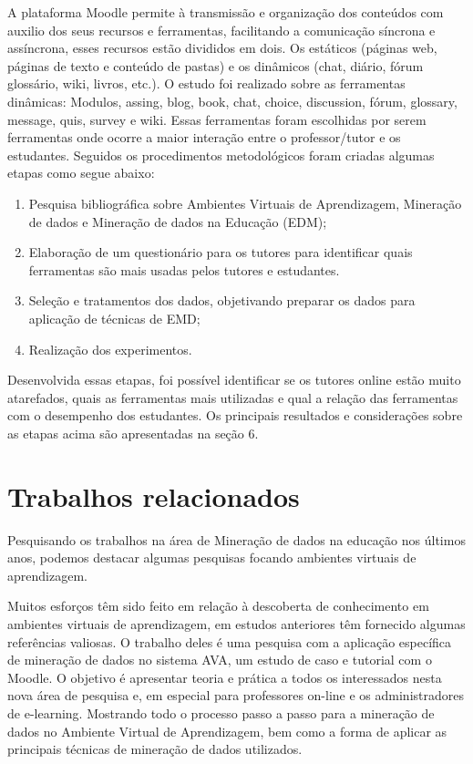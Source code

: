 \documentclass[12pt]{article}
\begin{document}
A plataforma Moodle permite à transmissão e organização dos conteúdos com auxilio dos seus recursos e ferramentas, facilitando a comunicação síncrona e assíncrona, esses recursos estão divididos em dois. Os estáticos (páginas web, páginas de texto e conteúdo de pastas) e os dinâmicos (chat, diário, fórum glossário, wiki, livros, etc.). O estudo foi realizado sobre as ferramentas dinâmicas: Modulos, assing, blog, book, chat, choice, discussion, fórum, glossary, message, quis, survey e wiki. Essas ferramentas foram escolhidas por serem ferramentas onde ocorre a maior interação entre o professor/tutor e os estudantes.
Seguidos os procedimentos metodológicos foram criadas algumas etapas como segue abaixo:
\begin{enumerate}
\item	Pesquisa bibliográfica sobre Ambientes Virtuais de Aprendizagem, Mineração de dados e Mineração de dados na Educação (EDM);
\item Elaboração de um questionário para os tutores para identificar quais ferramentas são mais usadas pelos tutores e estudantes. 
\item Seleção e tratamentos dos dados, objetivando preparar os dados para aplicação de técnicas de EMD;
\item Realização dos experimentos.
\end{enumerate} 
Desenvolvida essas etapas, foi possível identificar se os tutores online estão muito atarefados, quais as ferramentas mais utilizadas e qual a relação das ferramentas com o desempenho dos estudantes. Os principais resultados e considerações sobre as etapas acima são apresentadas na seção 6.

\section{Trabalhos relacionados}
Pesquisando os trabalhos na área de Mineração de dados na educação nos últimos anos, podemos destacar algumas pesquisas focando ambientes virtuais de aprendizagem. 

Muitos esforços têm sido feito em relação à descoberta de conhecimento em ambientes virtuais de aprendizagem, \cite{Romero5524021} em estudos anteriores têm fornecido algumas referências valiosas. O trabalho deles é uma pesquisa com a aplicação específica de mineração de dados no sistema AVA, um estudo de caso e tutorial com o Moodle. O objetivo é apresentar teoria e prática a todos os interessados nesta nova área de pesquisa e, em especial para professores on-line e os administradores de e-learning. Mostrando todo o processo passo a passo para a mineração de dados no Ambiente Virtual de Aprendizagem, bem como a forma de aplicar as principais técnicas de mineração de dados utilizados.
\end{document}
